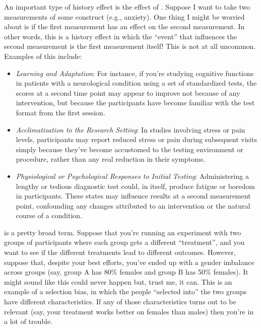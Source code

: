 
An important type of history effect is the effect of . Suppose I want to take two measurements of some construct (e.g., anxiety). One thing I might be worried about is if the first measurement has an effect on the second measurement. In other words, this is a history effect in which the ``event'' that influences the second measurement is the first measurement itself! This is not at all uncommon. Examples of this include:

\begin{itemize}
\item {\it Learning and Adaptation}: For instance, if you're studying cognitive functions in patients with a neurological condition using a set of standardized tests, the scores at a second time point may appear to improve not because of any intervention, but because the participants have become familiar with the test format from the first session.

\item {\it Acclimatization to the Research Setting}: In studies involving stress or pain levels, participants may report reduced stress or pain during subsequent visits simply because they've become accustomed to the testing environment or procedure, rather than any real reduction in their symptoms.

\item {\it Physiological or Psychological Responses to Initial Testing}: Administering a lengthy or tedious diagnostic test could, in itself, produce fatigue or boredom in participants. These states may influence results at a second measurement point, confounding any changes attributed to an intervention or the natural course of a condition.
\end{itemize}


 is a pretty broad term. Suppose that you're running an experiment with two groups of participants where each group gets a different ``treatment'', and you want to see if the different treatments lead to different outcomes. However, suppose that, despite your best efforts, you've ended up with a gender imbalance across groups (say, group A has 80\% females and group B has 50\% females). It might sound like this could never happen but, trust me, it can. This is an example of a selection bias, in which the people ``selected into'' the two groups have different characteristics. If any of those characteristics turns out to be relevant (say, your treatment works better on females than males) then you're in a lot of trouble. 


